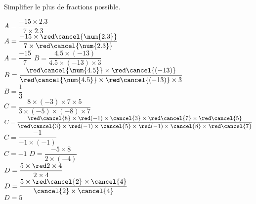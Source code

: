 \begin{corrige}
    Simplifier le plus de fractions possible.
    \begin{multicols}{2}
        \begin{spacing}{2}
            \begin{itemize}
                \def\item{}
                \item $A=\dfrac{-15\times\num{2.3}}{7\times\num{2.3}}$\\
                $A=\dfrac{-15\times{\red\cancel{\num{2.3}}}}{7\times{\red\cancel{\num{2.3}}}}$\\
                {\red $A=\dfrac{-15}{7}$}
                \item $B=\dfrac{\num{4.5}\times (-13)}{\num{4.5}\times (-13)\times 3}$\\
                $B=\dfrac{{\red\cancel{\num{4.5}}}\times {\red\cancel{(-13)}}}{{\red\cancel{\num{4.5}}}\times {\red\cancel{(-13)}}\times 3}$\\
                {\red $B=\dfrac{1}{3}$}\\
                \columnbreak                
                \item {\footnotesize $C=\dfrac{8\times (-3)\times 7\times 5}{3\times (-5)\times (-8)\times 7}$}\\
                {\scriptsize $C=\dfrac{{\red\cancel{8}}\times {\red (-1)\times \cancel{3}}\times {\red\cancel{7}}\times {\red\cancel{5}}}{{\red\cancel{3}}\times {\red (-1)\times \cancel{5}}\times {\red (-1)\times \cancel{8}}\times {\red\cancel{7}}}$}\\
                {\red $C=\dfrac{-1}{-1\times (-1)}$\\
                $C=-1$
                }
                \item $D=\dfrac{-5\times 8}{2\times (-4)}$\\
                $D=\dfrac{5\times {\red 2\times 4}}{2\times 4}$\\
                $D=\dfrac{5\times {\red \cancel{2}\times \cancel{4}}}{\cancel{2}\times \cancel{4}}$\\
                {\red $D=5$}
            \end{itemize}
        \end{spacing}       
    \end{multicols}
\end{corrige}

